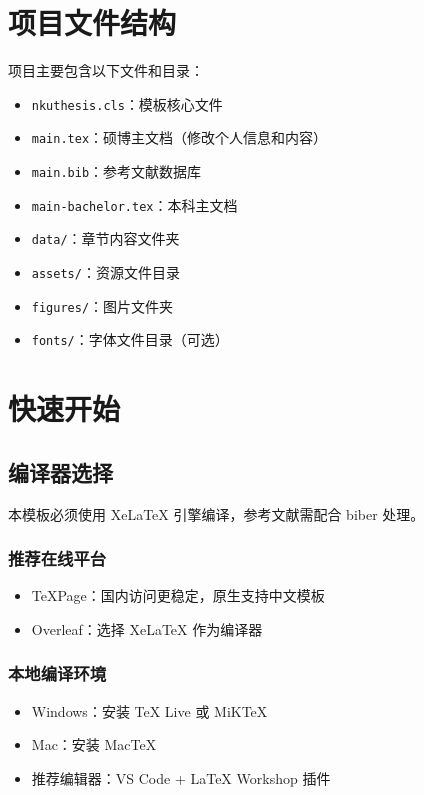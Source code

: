 \section{项目文件结构}

项目主要包含以下文件和目录：

\begin{itemize}
    \item \texttt{nkuthesis.cls}：模板核心文件
    \item \texttt{main.tex}：硕博主文档（修改个人信息和内容）
    \item \texttt{main.bib}：参考文献数据库
    \item \texttt{main-bachelor.tex}：本科主文档
    \item \texttt{data/}：章节内容文件夹
    \item \texttt{assets/}：资源文件目录
    \item \texttt{figures/}：图片文件夹
    \item \texttt{fonts/}：字体文件目录（可选）
\end{itemize}

\section{快速开始}

\subsection{编译器选择}

本模板必须使用 XeLaTeX 引擎编译，参考文献需配合 biber 处理。

\subsubsection{推荐在线平台}

\begin{itemize}
    \item TeXPage：国内访问更稳定，原生支持中文模板
    \item Overleaf：选择 XeLaTeX 作为编译器
\end{itemize}

\subsubsection{本地编译环境}

\begin{itemize}
    \item Windows：安装 TeX Live 或 MiKTeX
    \item Mac：安装 MacTeX
    \item 推荐编辑器：VS Code + LaTeX Workshop 插件
\end{itemize}

